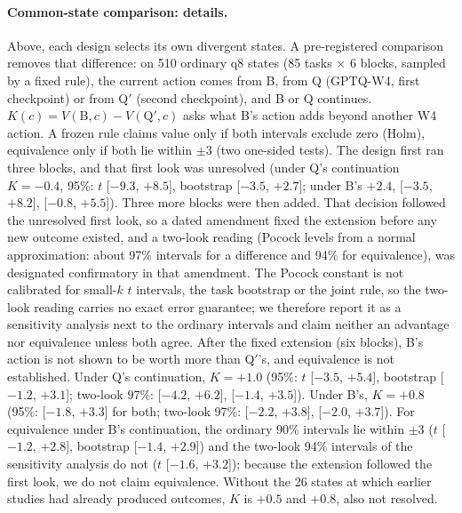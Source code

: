 \paragraph{Common-state comparison: details.} Above, each design selects its own divergent states. A pre-registered comparison removes that difference: on 510 ordinary q8 states (85 tasks $\times$ 6 blocks, sampled by a fixed rule), the current action comes from B, from Q (GPTQ-W4, first checkpoint) or from Q$'$ (second checkpoint), and B or Q continues. $K(c)=V(\mathrm{B},c)-V(\mathrm{Q}',c)$ asks what B's action adds beyond another W4 action. A frozen rule claims value only if both intervals exclude zero (Holm), equivalence only if both lie within $\pm$3\pp{} (two one-sided tests). %
The design first ran three blocks, and that first look was unresolved (under Q's continuation $K=-0.4$\pp{}, 95\%: $t$ [$-9.3$, $+8.5$], bootstrap [$-3.5$, $+2.7$]; under B's $+2.4$\pp{}, [$-3.5$, $+8.2$], [$-0.8$, $+5.5$]). Three more blocks were then added. That decision followed the unresolved first look, so a dated amendment fixed the extension before any new outcome existed, and a two-look reading (Pocock levels from a normal approximation: about 97\% intervals for a difference and 94\% for equivalence), was designated confirmatory in that amendment. The Pocock constant is not calibrated for small-$k$ $t$ intervals, the task bootstrap or the joint rule, so the two-look reading carries no exact error guarantee; we therefore report it as a sensitivity analysis next to the ordinary intervals and claim neither an advantage nor equivalence unless both agree. %
After the fixed extension (six blocks), B's action is not shown to be worth more than Q$'$'s, and equivalence is not established. Under Q's continuation, $K=+1.0$\pp{} (95\%: $t$ [$-3.5$, $+5.4$], bootstrap [$-1.2$, $+3.1$]; two-look 97\%: [$-4.2$, $+6.2$], [$-1.4$, $+3.5$]). Under B's, $K=+0.8$\pp{} (95\%: [$-1.8$, $+3.3$] for both; two-look 97\%: [$-2.2$, $+3.8$], [$-2.0$, $+3.7$]). For equivalence under B's continuation, the ordinary 90\% intervals lie within $\pm$3\pp{} ($t$ [$-1.2$, $+2.8$], bootstrap [$-1.4$, $+2.9$]) and the two-look 94\% intervals of the sensitivity analysis do not ($t$ [$-1.6$, $+3.2$]); because the extension followed the first look, we do not claim equivalence. Without the 26 states at which earlier studies had already produced outcomes, $K$ is $+0.5$ and $+0.8$\pp{}, also not resolved. %

